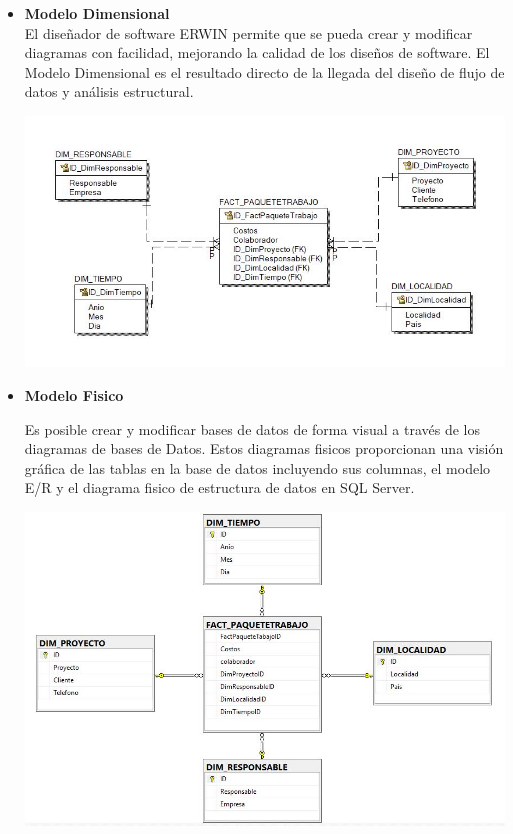 \begin{itemize}
    \item \textbf{Modelo Dimensional}
\\
El diseñador de software ERWIN permite que se pueda crear y modificar diagramas con facilidad, mejorando la calidad de los diseños de software. El Modelo Dimensional es el resultado directo de la llegada del diseño de flujo de datos y análisis estructural.

	\begin{center}
	\includegraphics[width=17cm]{./Imagenes/Ejercicio3Logico}
	\end{center}	

    \item \textbf{Modelo Fisico}

Es posible crear y modificar bases de datos de forma visual a través de los diagramas de bases de Datos. Estos diagramas fisicos proporcionan una visión gráfica de las tablas en la base de datos incluyendo sus columnas, el modelo E/R y el diagrama fisico de estructura de datos en SQL Server.

	\begin{center}
	\includegraphics[width=17cm]{./Imagenes/Ejercicio3Fisico}
	\end{center}	


\end{itemize}
